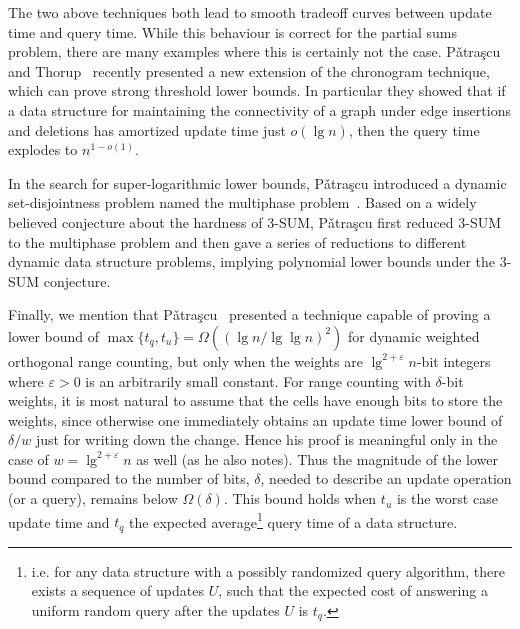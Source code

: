 \documentclass[letterpaper]{article}
\newcommand{\eps}{\varepsilon}
\begin{document}
The two above techniques both lead to smooth tradeoff curves between
update time and query time. While this behaviour is correct for the
partial sums problem, there are many examples where this is certainly
not the case. P{\v a}tra{\c s}cu and Thorup~\cite{patrascu11unions}
recently presented a new extension of the chronogram technique, which
can prove strong threshold lower bounds. In particular they showed
that if a data structure for maintaining the connectivity of a graph
under edge insertions and deletions has amortized update
time just $o(\lg n)$, then the query time explodes to $n^{1-o(1)}$.

In the search for super-logarithmic lower bounds, P{\v a}tra{\c s}cu introduced
a dynamic set-disjointness problem named the multiphase
problem~\cite{patrascu10mp-3sum}. Based on a widely believed
conjecture about the hardness of 3-SUM, P{\v a}tra{\c s}cu first reduced 3-SUM
to the multiphase problem and then gave a series of reductions to
different dynamic data structure problems, implying polynomial lower
bounds under the 3-SUM conjecture.

Finally, we mention that P{\v a}tra{\c s}cu~\cite{patrascu07sum2D}
presented a technique capable of proving a lower bound of
$\max\{t_q,t_u\}=\Omega((\lg n/\lg \lg n)^2)$ for dynamic weighted
orthogonal range counting, but only when the weights are
$\lg^{2+\eps}n$-bit integers where $\eps>0$ is an arbitrarily small
constant. For range counting with $\delta$-bit weights, it is most
natural to assume that the cells have enough bits to store the
weights, since otherwise one immediately obtains an update time lower
bound of $\delta/w$ just for writing down the change. Hence his proof
is meaningful only in the case of $w=\lg^{2+\eps}n$ as well (as
he also notes). Thus the magnitude of the lower bound compared to the
number of bits, $\delta$, needed to describe an update operation (or a
query), remains below $\Omega(\delta)$.  This bound holds when $t_u$
is the worst case update time and $t_q$ the expected
average\footnote{i.e. for any data structure with a possibly
  randomized query algorithm, there exists a sequence of updates $U$,
  such that the expected cost of answering a uniform random query
  after the updates $U$ is $t_q$.} query time of a data structure.
\end{document}

